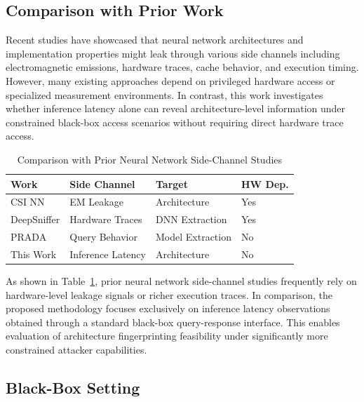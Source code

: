 \documentclass[conference]{IEEEtran}
\begin{document}
\subsection{Comparison with Prior Work}

Recent studies have showcased that neural network architectures and implementation properties might leak through various side channels including electromagnetic emissions, hardware traces, cache behavior, and execution timing. However, many existing approaches depend on privileged hardware access or specialized measurement environments. In contrast, this work investigates whether inference latency alone can reveal architecture-level information under constrained black-box access scenarios without requiring direct hardware trace access.

\begin{table}[h]
\centering
\caption{Comparison with Prior Neural Network Side-Channel Studies}
\label{tab:prior_work_comparison}
\renewcommand{\arraystretch}{1.1}
\setlength{\tabcolsep}{3pt}

\begin{tabular}{p{1.4cm} p{2cm} p{1.8cm} p{1.2cm}}
\toprule
\textbf{Work} & \textbf{Side Channel} & \textbf{Target} & \textbf{HW Dep.} \\
\midrule
CSI NN & EM Leakage & Architecture & Yes \\
DeepSniffer & Hardware Traces & DNN Extraction & Yes \\
PRADA & Query Behavior & Model Extraction & No \\
This Work & Inference Latency & Architecture & No \\
\bottomrule
\end{tabular}

\end{table}

As shown in Table~\ref{tab:prior_work_comparison}, prior neural network side-channel studies frequently rely on hardware-level leakage signals or richer execution traces. In comparison, the proposed methodology focuses exclusively on inference latency observations obtained through a standard black-box query-response interface. This enables evaluation of architecture fingerprinting feasibility under significantly more constrained attacker capabilities.

\subsection{Black-Box Setting}
\end{document}
